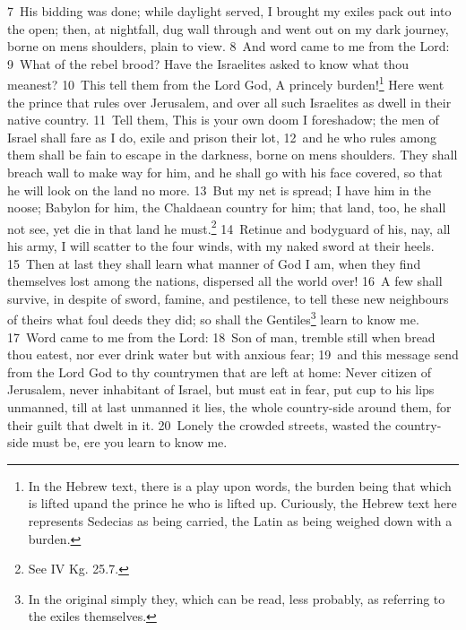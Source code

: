 \documentclass[10pt]{book} %
\begin{document}
\textcolor{benred8}{7}~His bidding was done; while daylight served, I brought my exile\textquotesingle s pack out into the open; then, at nightfall, dug wall through and went out on my dark journey, borne on men\textquotesingle s shoulders, plain to view. \textcolor{benred8}{8}~And word came to me from the Lord: \textcolor{benred8}{9}~What of the rebel brood? Have the Israelites asked to know what thou meanest? \textcolor{benred8}{10}~This tell them from the Lord God, A princely burden!\footnote[2]{In the Hebrew text, there is a play upon words, the burden being \textasciigrave that which is lifted up\textquotesingle  and the prince \textasciigrave he who is lifted up\textquotesingle . Curiously, the Hebrew text here represents Sedecias as being carried, the Latin as being weighed down with a burden.} Here went the prince that rules over Jerusalem, and over all such Israelites as dwell in their native country. \textcolor{benred8}{11}~Tell them, This is your own doom I foreshadow; the men of Israel shall fare as I do, exile and prison their lot, \textcolor{benred8}{12}~and he who rules among them shall be fain to escape in the darkness, borne on men\textquotesingle s shoulders. They shall breach wall to make way for him, and he shall go with his face covered, so that he will look on the land no more. \textcolor{benred8}{13}~But my net is spread; I have him in the noose; Babylon for him, the Chaldaean country for him; that land, too, he shall not see, yet die in that land he must.\footnote[3]{See IV Kg. 25.7.} \textcolor{benred8}{14}~Retinue and bodyguard of his, nay, all his army, I will scatter to the four winds, with my naked sword at their heels. \textcolor{benred8}{15}~Then at last they shall learn what manner of God I am, when they find themselves lost among the nations, dispersed all the world over! \textcolor{benred8}{16}~A few shall survive, in despite of sword, famine, and pestilence, to tell these new neighbours of theirs what foul deeds they did; so shall the Gentiles\footnote[4]{In the original simply \textasciigrave they\textquotesingle , which can be read, less probably, as referring to the exiles themselves.} learn to know me.
\textcolor{benred8}{17}~Word came to me from the Lord: \textcolor{benred8}{18}~Son of man, tremble still when bread thou eatest, nor ever drink water but with anxious fear; \textcolor{benred8}{19}~and this message send from the Lord God to thy countrymen that are left at home: Never citizen of Jerusalem, never inhabitant of Israel, but must eat in fear, put cup to his lips unmanned, till at last unmanned it lies, the whole country-side around them, for their guilt that dwelt in it. \textcolor{benred8}{20}~Lonely the crowded streets, wasted the country-side must be, ere you learn to know me.
\end{document}
